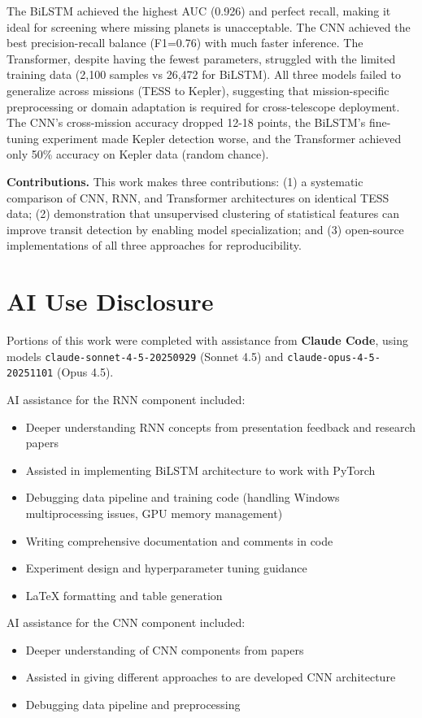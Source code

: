 \documentclass[letterpaper]{article} %
\begin{document}
The BiLSTM achieved the highest AUC (0.926) and perfect recall, making it ideal for screening where missing planets is unacceptable. The CNN achieved the best precision-recall balance (F1=0.76) with much faster inference. The Transformer, despite having the fewest parameters, struggled with the limited training data (2,100 samples vs 26,472 for BiLSTM). All three models failed to generalize across missions (TESS to Kepler), suggesting that mission-specific preprocessing or domain adaptation is required for cross-telescope deployment. The CNN's cross-mission accuracy dropped 12-18 points, the BiLSTM's fine-tuning experiment made Kepler detection worse, and the Transformer achieved only 50\% accuracy on Kepler data (random chance).

\textbf{Contributions.} This work makes three contributions: (1) a systematic comparison of CNN, RNN, and Transformer architectures on identical TESS data; (2) demonstration that unsupervised clustering of statistical features can improve transit detection by enabling model specialization; and (3) open-source implementations of all three approaches for reproducibility.

\section*{AI Use Disclosure}

Portions of this work were completed with assistance from \textbf{Claude Code}, using models \texttt{claude-sonnet-4-5-20250929} (Sonnet 4.5) and \texttt{claude-opus-4-5-20251101} (Opus 4.5).

AI assistance for the RNN component included:
\begin{itemize}
\item Deeper understanding RNN concepts from presentation feedback and research papers
\item Assisted in implementing BiLSTM architecture to work with PyTorch
\item Debugging data pipeline and training code (handling Windows multiprocessing issues, GPU memory management)
\item Writing comprehensive documentation and comments in code
\item Experiment design and hyperparameter tuning guidance
\item LaTeX formatting and table generation
\end{itemize}

AI assistance for the CNN component included:
\begin{itemize}
\item Deeper understanding of CNN components from papers
\item Assisted in giving different approaches to are developed CNN architecture
\item Debugging data pipeline and preprocessing
\end{itemize}
\end{document}
